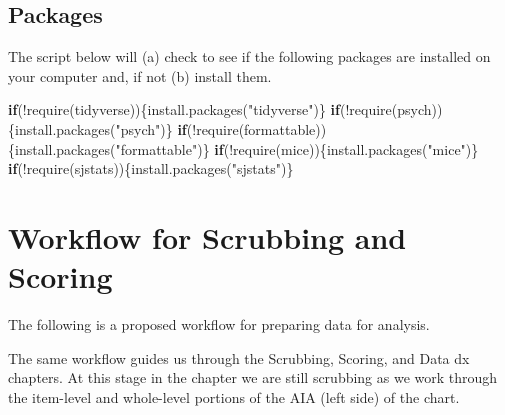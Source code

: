 \documentclass[
  11pt,
]{book}
\newenvironment{Shaded}{\begin{snugshade}}{\end{snugshade}}
\newcommand{\ControlFlowTok}[1]{\textcolor[rgb]{0.13,0.29,0.53}{\textbf{#1}}}
\newcommand{\FunctionTok}[1]{\textcolor[rgb]{0.00,0.00,0.00}{#1}}
\newcommand{\NormalTok}[1]{#1}
\newcommand{\SpecialCharTok}[1]{\textcolor[rgb]{0.00,0.00,0.00}{#1}}
\newcommand{\StringTok}[1]{\textcolor[rgb]{0.31,0.60,0.02}{#1}}
\begin{document}
\hypertarget{packages-2}{%
\subsection{Packages}\label{packages-2}}

The script below will (a) check to see if the following packages are installed on your computer and, if not (b) install them.

\begin{Shaded}
\begin{Highlighting}[]
\ControlFlowTok{if}\NormalTok{(}\SpecialCharTok{!}\FunctionTok{require}\NormalTok{(tidyverse))\{}\FunctionTok{install.packages}\NormalTok{(}\StringTok{"tidyverse"}\NormalTok{)\}}
\ControlFlowTok{if}\NormalTok{(}\SpecialCharTok{!}\FunctionTok{require}\NormalTok{(psych))\{}\FunctionTok{install.packages}\NormalTok{(}\StringTok{"psych"}\NormalTok{)\}}
\ControlFlowTok{if}\NormalTok{(}\SpecialCharTok{!}\FunctionTok{require}\NormalTok{(formattable))\{}\FunctionTok{install.packages}\NormalTok{(}\StringTok{"formattable"}\NormalTok{)\}}
\ControlFlowTok{if}\NormalTok{(}\SpecialCharTok{!}\FunctionTok{require}\NormalTok{(mice))\{}\FunctionTok{install.packages}\NormalTok{(}\StringTok{"mice"}\NormalTok{)\}}
\ControlFlowTok{if}\NormalTok{(}\SpecialCharTok{!}\FunctionTok{require}\NormalTok{(sjstats))\{}\FunctionTok{install.packages}\NormalTok{(}\StringTok{"sjstats"}\NormalTok{)\}}
\end{Highlighting}
\end{Shaded}

\hypertarget{workflow-for-scrubbing-and-scoring-1}{%
\section{Workflow for Scrubbing and Scoring}\label{workflow-for-scrubbing-and-scoring-1}}

The following is a proposed workflow for preparing data for analysis.

The same workflow guides us through the Scrubbing, Scoring, and Data dx chapters. At this stage in the chapter we are still scrubbing as we work through the item-level and whole-level portions of the AIA (left side) of the chart.
\end{document}
